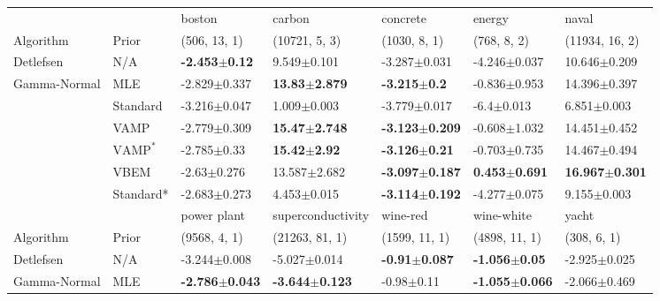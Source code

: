 \begin{tabular}{lllllll}
\toprule
             &           &                    boston &                    carbon &                   concrete &                    energy &                      naval \\
Algorithm & Prior& (506, 13, 1)& (10721, 5, 3)& (1030, 8, 1)& (768, 8, 2)& (11934, 16, 2)\\
\midrule
Detlefsen & N/A &  \textbf{-2.453$\pm$0.12} &           9.549$\pm$0.101 &           -3.287$\pm$0.031 &          -4.246$\pm$0.037 &           10.646$\pm$0.209 \\
Gamma-Normal & MLE &          -2.829$\pm$0.337 &  \textbf{13.83$\pm$2.879} &    \textbf{-3.215$\pm$0.2} &          -0.836$\pm$0.953 &           14.396$\pm$0.397 \\
             & Standard &          -3.216$\pm$0.047 &           1.009$\pm$0.003 &           -3.779$\pm$0.017 &            -6.4$\pm$0.013 &            6.851$\pm$0.003 \\
             & VAMP &          -2.779$\pm$0.309 &  \textbf{15.47$\pm$2.748} &  \textbf{-3.123$\pm$0.209} &          -0.608$\pm$1.032 &           14.451$\pm$0.452 \\
             & $\text{VAMP}^*$ &           -2.785$\pm$0.33 &   \textbf{15.42$\pm$2.92} &   \textbf{-3.126$\pm$0.21} &          -0.703$\pm$0.735 &           14.467$\pm$0.494 \\
             & VBEM &           -2.63$\pm$0.276 &          13.587$\pm$2.682 &  \textbf{-3.097$\pm$0.187} &  \textbf{0.453$\pm$0.691} &  \textbf{16.967$\pm$0.301} \\
             & Standard* &          -2.683$\pm$0.273 &           4.453$\pm$0.015 &  \textbf{-3.114$\pm$0.192} &          -4.277$\pm$0.075 &            9.155$\pm$0.003 \\
\midrule
             &           &                power plant &          superconductivity &                  wine-red &                 wine-white &                      yacht \\
Algorithm & Prior& (9568, 4, 1)& (21263, 81, 1)& (1599, 11, 1)& (4898, 11, 1)& (308, 6, 1)\\
\midrule
Detlefsen & N/A &           -3.244$\pm$0.008 &           -5.027$\pm$0.014 &  \textbf{-0.91$\pm$0.087} &   \textbf{-1.056$\pm$0.05} &           -2.925$\pm$0.025 \\
Gamma-Normal & MLE &  \textbf{-2.786$\pm$0.043} &  \textbf{-3.644$\pm$0.123} &            -0.98$\pm$0.11 &  \textbf{-1.055$\pm$0.066} &           -2.066$\pm$0.469 \\

\end{tabular}
